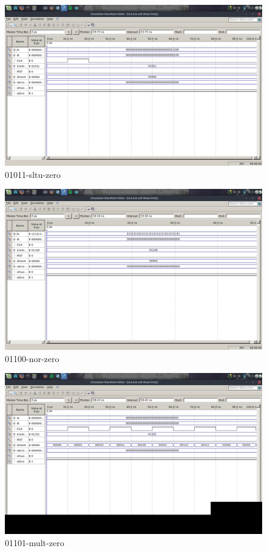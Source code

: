 \documentclass[12pt]{article}
\begin{document}
\begin{figure}[H]
	\centering
	\includegraphics[width=.8\textwidth]{01011-sltu-zero.png}
	\caption{01011-sltu-zero}
	\label{fig:01011-sltu-zero}
\end{figure}

\begin{figure}[H]
	\centering
	\includegraphics[width=.8\textwidth]{01100-nor-zero.png}
	\caption{01100-nor-zero}
	\label{fig:01100-nor-zero}
\end{figure}

\begin{figure}[H]
	\centering
	\includegraphics[width=.8\textwidth]{01101-mult-zero.png}
	\caption{01101-mult-zero}
	\label{fig:01101-mult-zero}
\end{figure}
\end{document}
